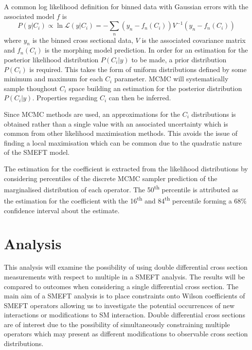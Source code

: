 \documentclass[a4paper]{article}
\newcommand{\ts}{\textsuperscript}
\begin{document}
A common log likelihood definition for binned data with Gaussian errors with the associated model $f$ is
\begin{equation}
    P(y | C_{i}) \propto \ln\mathcal{L}(y | C_{i}) = -\sum\limits_{n} (y_{n} - f_{n}(C_{i})) V^{-1} (y_{n} - f_{n}(C_{i}))
\end{equation}
where $y_{n}$ is the binned cross sectional data, $V$ is the associated covariance matrix and $f_{n}(C_{i})$ is the morphing model prediction.
In order for an estimation for the posterior likelihood distribution $P(C_{i} | y)$ to be made, a prior distribution $P(C_{i})$ is required.
This takes the form of uniform distributions defined by some minimum and maximum for each $C_{i}$ parameter.
MCMC will systematically sample thoughout $C_{i}$ space building an estimation for the posterior distribution $P(C_{i}|y)$.
Properties regarding $C_{i}$ can then be inferred.

Since MCMC methods are used, an approximations for the $C_{i}$ distributions is obtained rather than a single value with an associated uncertainty which is common from other likelihood maximisation methods.
This avoids the issue of finding a local maximisation which can be common due to the quadratic nature of the SMEFT model.

The estimation for the coefficient is extracted from the likelihood distributions by considering percentiles of the discrete MCMC sampler prediction of the marginalised distribution of each operator.
The 50\ts{th} percentile is attributed as the estimation for the coefficient with the 16\ts{th} and 84\ts{th} percentile forming a 68\% confidence interval about the estimate.


\section{Analysis}
This analysis will examine the possibility of using double differential cross section measurements with respect to multiple in a SMEFT analysis.
The results will be compared to outcomes when considering a single differential cross section.
The main aim of a SMEFT analysis is to place constraints onto Wilson coefficients of SMEFT operators allowing us to investigate the potential occurrences of new interactions or modifications to SM interaction.
Double differential cross sections are of interest due to the possibility of simultaneously constraining multiple operators which may present as different modifications to observable cross section distributions.
\end{document}
